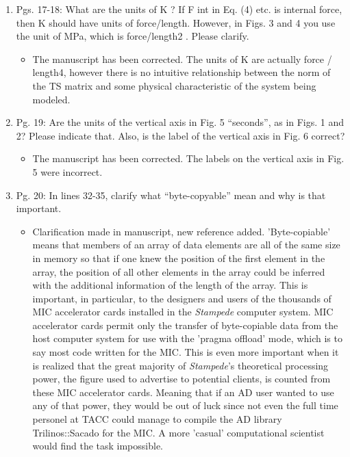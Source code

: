 \documentclass{article}
\begin{document}
\begin{enumerate}
  \item
    Pgs. 17-18: What are the units of K ? If F int in Eq. (4) etc. is internal force, then K
    should have units of force/length. However, in Figs. 3 and 4 you use the unit of
    MPa, which is force/length2 . Please clarify.

{\color{red}  
\begin{itemize}
     \item
    The manuscript has been corrected. The units of K are actually force / length4, however there is no intuitive relationship between the norm of the TS matrix and some physical characteristic of the system being modeled.
  \end{itemize}}

    \item
        Pg. 19: Are the units of the vertical axis in Fig. 5 “seconds”, as in Figs. 1 and 2?
        Please indicate that. Also, is the label of the vertical axis in Fig. 6 correct?

{\color{red}  
\begin{itemize}
     \item
        The manuscript has been corrected. The labels on the vertical axis in Fig. 5 were incorrect. 
  \end{itemize}}

\item
Pg. 20: In lines 32-35, clarify what “byte-copyable” mean and why is that important.

{\color{red}  
\begin{itemize}
     \item
     Clarification made in manuscript, new reference added. 
     'Byte-copiable' means that members of an array of data elements are all of
     the same size in memory so that if one knew the position of the first
     element in the array, the position of all other elements in the array
     could be inferred with the additional information of the length of the
     array. This is important, in particular, to the designers and users of the
     thousands of MIC accelerator cards installed in the \emph{Stampede}
     computer system. MIC accelerator cards permit only the transfer of
     byte-copiable data from the host computer system for use with the 'pragma
     offload' mode, which is to say most code written for the MIC. This is even
     more important when it is realized that the great majority of
     \emph{Stampede}'s theoretical processing power, the figure used to advertise to potential clients, is counted from these MIC
     accelerator cards. Meaning that if an AD user wanted to use any of that
     power, they would be out of luck since not even the full time personel at
     TACC could manage to compile the AD library Trilinos::Sacado for the MIC.
     A more 'casual' computational scientist would find the task impossible.
  \end{itemize}}


\end{enumerate}
\end{document}
